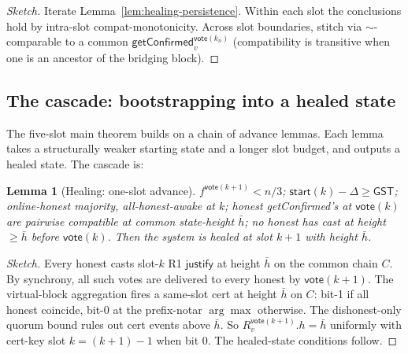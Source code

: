 \documentclass{article}
\newcommand{\just}{\ensuremath{\mathsf{justify}}\xspace}
\newcommand{\jtargets}{\mathsf{jtargets}}
\newcommand{\start}{\mathsf{start}}
\newcommand{\vote}{\mathsf{vote}}
\newcommand{\GST}{\ensuremath{\mathsf{GST}}}
\newcommand{\OHM}{online-honest majority\xspace}
\newcommand{\AHA}{all-honest-awake\xspace}
\newcommand{\getConfirmed}{\textsf{getConfirmed}\xspace}
\newcommand{\comm}[1]{\bar{#1}}
\theoremstyle{plain}
\newtheorem{lemma}[theorem]{Lemma}
\theoremstyle{definition}
\theoremstyle{remark}
\begin{document}
\begin{proof}[Sketch] Iterate Lemma~\ref{lem:healing-persistence}. Within each slot the conclusions hold by intra-slot compat-monotonicity. Across slot boundaries, stitch via $\sim$-comparable to a common $\getConfirmed_v^{\vote(k_n)}$ (compatibility is transitive when one is an ancestor of the bridging block). \end{proof}

\subsection{The cascade: bootstrapping into a healed state}\label{sec:cascade}

The five-slot main theorem builds on a chain of advance lemmas. Each lemma takes a structurally weaker starting state and a longer slot budget, and outputs a healed state. The cascade is:

\begin{center}
\end{center}

\begin{lemma}[Healing: one-slot advance]\label{lem:healing-one-slot}
$f^{\vote(k+1)} < n/3$; $\start(k) - \Delta \geq \GST$; \OHM, \AHA at $k$; honest \getConfirmed{}'s at $\vote(k)$ are pairwise compatible at common state-height $\comm{h}$; no honest has cast at height $\geq \comm{h}$ before $\vote(k)$. Then the system is healed at slot $k+1$ with height $\comm{h}$.
\end{lemma}

\begin{proof}[Sketch] Every honest casts slot-$k$ R1 \just{} at height $\comm{h}$ on the common chain $C$. By synchrony, all such votes are delivered to every honest by $\vote(k+1)$. The virtual-block aggregation fires a same-slot cert at height $\comm{h}$ on $C$: bit-1 if all honest \jtargets coincide, bit-0 at the prefix-notar $\arg\max$ otherwise. The dishonest-only quorum bound rules out cert events above $\comm{h}$. So $R_v^{\vote(k+1)}.h = \comm{h}$ uniformly with cert-key slot $k = (k+1)-1$ when bit 0. The healed-state conditions follow. \end{proof}
\end{document}
